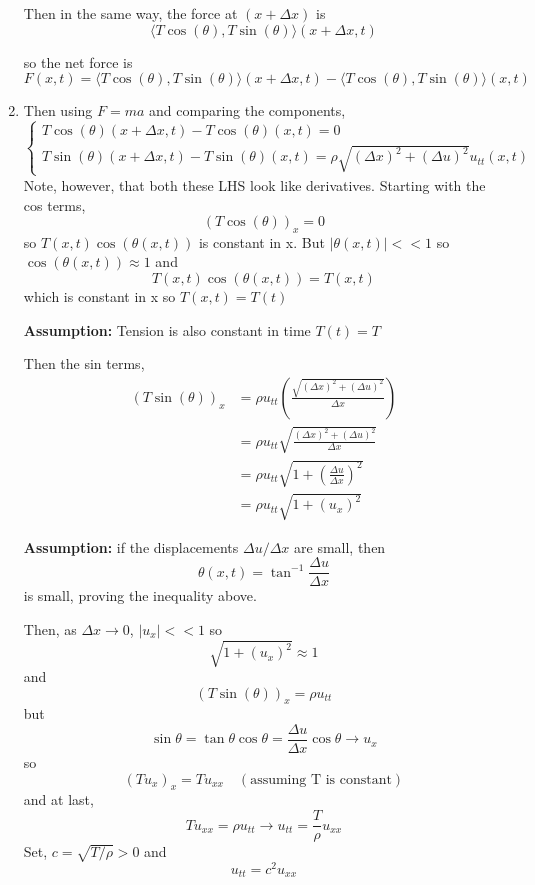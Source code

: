 \documentclass[12pt]{article}
\newcommand{\brak}[1]{\langle #1 \rangle}
\begin{document}
\begin{enumerate}
    Then in the same way, the force at $(x + \Delta x)$ is 
    \[\brak{T\cos(\theta), T\sin(\theta)}(x + \Delta x, t)\]

    so the net force is 
    \[F(x, t) = \brak{T\cos(\theta), T\sin(\theta)}(x + \Delta x, t) - \brak{T\cos(\theta), T\sin(\theta)}(x, t)\]

    \item Then using $F = ma$ and comparing the components, 
    \[\begin{cases}
        T\cos(\theta)(x + \Delta x, t) - T\cos(\theta)(x, t) = 0\\
        T\sin(\theta)(x + \Delta x, t) - T\sin(\theta)(x, t) = \rho \sqrt{(\Delta x)^2 + (\Delta u)^2} u_{tt}(x, t)
    \end{cases}\]
    Note, however, that both these LHS look like derivatives. 
    Starting with the cos terms,
    \[(T\cos(\theta))_x = 0\]
    so $T(x, t)\cos(\theta(x, t))$ is constant in x. 
    But $|\theta(x, t)| << 1$ so $\cos(\theta(x, t)) \approx 1$ and 
    \[T(x, t) \cos(\theta(x, t)) = T(x, t)\]
    which is constant in x so $T(x, t) = T(t)$ 

    \textbf{Assumption:} Tension is also constant in time $T(t) = T$

    Then the sin terms, 
    \begin{align*}
        (T\sin(\theta))_x &= \rho u_{tt} \left(\frac{\sqrt{(\Delta x)^2 + (\Delta u)^2}}{\Delta x}\right)\\
        &= \rho u_{tt} \sqrt{\frac{(\Delta x)^2 + (\Delta u)^2}{\Delta x}} \\
        &= \rho u_{tt}  \sqrt{1 + \left(\frac{\Delta u}{\Delta x}\right)^2} \\
        &= \rho u_{tt} \sqrt{1 + (u_x)^2}
    \end{align*}

    \textbf{Assumption:} if the displacements $\Delta u/\Delta x$ are small, then 
    \[\theta(x, t) = \tan^{-1}\frac{\Delta u}{\Delta x}\]
    is small, proving the inequality above. 

    Then, as $\Delta x \to 0$, $|u_x| << 1$ so 
    \[\sqrt{1 + (u_x)^2} \approx 1\]
    and 
    \[(T\sin(\theta))_x = \rho u_{tt}\]
    but 
    \[\sin \theta  = \tan \theta \cos \theta = \frac{\Delta u}{\Delta x} \cos \theta \to u_x\]
    so 
    \[(Tu_x)_x = Tu_{xx} \quad (\text{assuming T is constant})\] 
    and at last, 
    \[Tu_{xx} = \rho u_{tt} \longrightarrow u_{tt} = \frac{T}{\rho}u_{xx}\]
    Set, $c = \sqrt{T / \rho} > 0$ and 
    \[\boxed{u_{tt} = c^2 u_{xx}}\]
\end{enumerate} 
\end{document}
